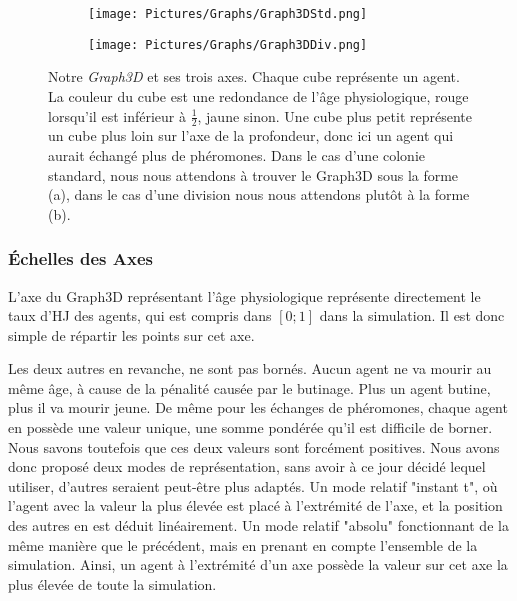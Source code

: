 	\begin{figure}
	\centering
	
	\begin{subfigure}{\textwidth}
	\centering
	\texttt{[image: Pictures/Graphs/Graph3DStd.png]}
	\caption{}
	\label{Graph3DStd}	
	\end{subfigure}
	
	\begin{subfigure}{\textwidth}
	\centering
	\texttt{[image: Pictures/Graphs/Graph3DDiv.png]}
	\caption{}
	\label{Graph3DDiv}
	\end{subfigure}
	
	\caption[Notre \textit{Graph3D} et ses trois axes.]{Notre \textit{Graph3D} et ses trois axes. Chaque cube représente un agent. La couleur du cube est une redondance de l'âge physiologique, rouge lorsqu'il est inférieur à $\frac{1}{2}$, jaune sinon. Une cube plus petit représente un cube plus loin sur l'axe de la profondeur, donc ici un agent qui aurait échangé plus de phéromones. Dans le cas d'une colonie standard, nous nous attendons à trouver le Graph3D sous la forme (a), dans le cas d'une division nous nous attendons plutôt à la forme (b).}	
	\label{Graph3D}
	\end{figure}
	
	\subsubsection{Échelles des Axes}
	L'axe du Graph3D représentant l'âge physiologique représente directement le taux d'HJ des agents, qui est compris dans $[0;1]$ dans la simulation. Il est donc simple de répartir les points sur cet axe.
	
	Les deux autres en revanche, ne sont pas bornés. Aucun agent ne va mourir au même âge, à cause de la pénalité causée par le butinage. Plus un agent butine, plus il va mourir jeune. De même pour les échanges de phéromones, chaque agent en possède une valeur unique, une somme pondérée qu'il est difficile de borner. Nous savons toutefois que ces deux valeurs sont forcément positives. Nous avons donc proposé deux modes de représentation, sans avoir à ce jour décidé lequel utiliser, d'autres seraient peut-être plus adaptés. Un mode relatif "instant t", où l'agent avec la valeur la plus élevée est placé à l'extrémité de l'axe, et la position des autres en est déduit linéairement. Un mode relatif "absolu" fonctionnant de la même manière que le précédent, mais en prenant en compte l'ensemble de la simulation. Ainsi, un agent à l'extrémité d'un axe possède la valeur sur cet axe la plus élevée de toute la simulation.
	
